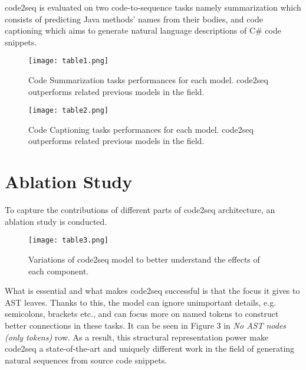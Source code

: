 \documentclass[11pt]{article}
\begin{document}
code2seq is evaluated on two code-to-sequence tasks namely summarization which consists of predicting Java methods' names from their bodies, and code captioning which aims to generate natural language descriptions of C\# code snippets.

\begin{figure}[h]
    \centering
    \texttt{[image: table1.png]}
    \caption{Code Summarization tasks performances for each model. code2seq outperforms related previous models in the field.}
    \label{fig:my_label}
\end{figure}

\begin{figure}[h]
    \centering
    \texttt{[image: table2.png]}
    \caption{Code Captioning tasks performances for each model. code2seq outperforms related previous models in the field.}
    \label{fig:my_label}
\end{figure}

\newpage
\section{Ablation Study}

To capture the contributions of different parts of code2seq architecture, an ablation study is conducted.

\begin{figure}[h]
    \centering
    \texttt{[image: table3.png]}
    \caption{Variations of code2seq model to better understand the effects of each component.}
    \label{fig:my_label}
\end{figure}

What is essential and what makes code2seq successful is that the focus it gives to AST leaves. Thanks to this, the model can ignore unimportant details, e.g. semicolons, brackets etc., and can focus more on named tokens to construct better connections in these tasks. It can be seen in Figure 3 in \textit{No AST nodes (only tokens)} row. As a result, this structural representation power make code2seq a state-of-the-art and uniquely different work in the field of generating natural sequences from source code snippets.
\end{document}
